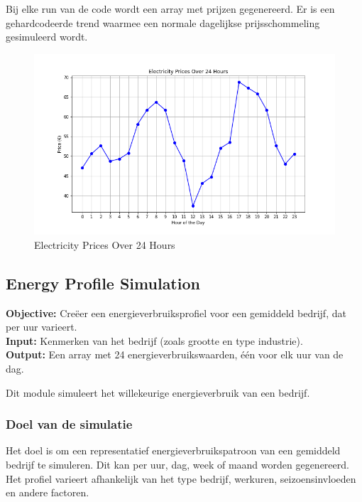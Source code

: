 \documentclass[../main.tex]{subfiles}
\begin{document}
Bij elke run van de code wordt een array met prijzen gegenereerd. Er is een gehardcodeerde trend waarmee een normale dagelijkse prijsschommeling gesimuleerd wordt.

\begin{figure}[h!]
  \centering
  \includegraphics[width=\textwidth]{figures/price_generation_plot.png}
  \caption{Electricity Prices Over 24 Hours}
  \label{fig:price_plot}
\end{figure}

\FloatBarrier

\subsection{Energy Profile Simulation}

\textbf{Objective:} Creëer een energieverbruiksprofiel voor een gemiddeld bedrijf, dat per uur varieert. \\
\textbf{Input:} Kenmerken van het bedrijf (zoals grootte en type industrie). \\
\textbf{Output:} Een array met 24 energieverbruikswaarden, één voor elk uur van de dag.

Dit module simuleert het willekeurige energieverbruik van een bedrijf.

\subsubsection{Doel van de simulatie}
Het doel is om een representatief energieverbruikspatroon van een gemiddeld bedrijf te simuleren. Dit kan per uur, dag, week of maand worden gegenereerd. Het profiel varieert afhankelijk van het type bedrijf, werkuren, seizoensinvloeden en andere factoren.
\end{document}
